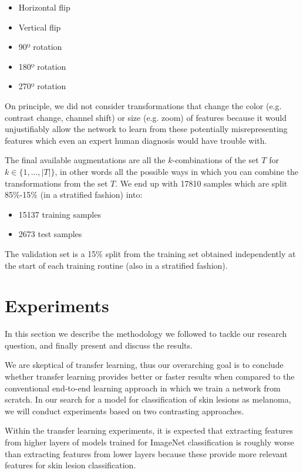 \begin{itemize}
    \item Horizontal flip
    \item Vertical flip
    \item 90º rotation
    \item 180º rotation
    \item 270º rotation
\end{itemize}

On principle, we did not consider transformations that change the color (e.g. contrast change, channel shift) or size (e.g. zoom) of features because it would unjustifiably allow the network to learn from these potentially misrepresenting features which even an expert human diagnosis would have trouble with.

The final available augmentations are all the $k$-combinations of the set $T$ for $k \in \{1, ..., |T|\}$, in other words all the possible ways in which you can combine the transformations from the set $T$. We end up with 17810 samples which are split 85\%-15\% (in a stratified fashion) into:

\begin{itemize}
    \item 15137 training samples
    \item 2673 test samples
\end{itemize}

The validation set is a 15\% split from the training set obtained independently at the start of each training routine (also in a stratified fashion).

\section{Experiments}

In this section we describe the methodology we followed to tackle our research question, and finally present and discuss the results.

We are skeptical of transfer learning, thus our overarching goal is to conclude whether transfer learning provides better or faster results when compared to the conventional end-to-end learning approach in which we train a network from scratch. In our search for a model for classification of skin lesions as melanoma, we will conduct experiments based on two contrasting approaches.

Within the transfer learning experiments, it is expected that extracting features from higher layers of models trained for ImageNet\cite{imagenet} classification is roughly worse than extracting features from lower layers because these provide more relevant features for skin lesion classification.

